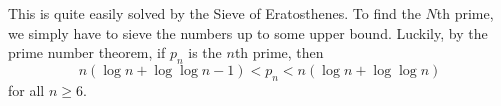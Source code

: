 This is quite easily solved by the Sieve of Eratosthenes. To find the $N$th prime, we simply have to sieve the numbers up to
some upper bound. Luckily, by the prime number theorem, if $p_n$ is the $n$th prime, then
$$n\left(\log n+\log\log n-1\right)< p_n < n(\log n+\log\log n)$$
for all $n\ge 6$.